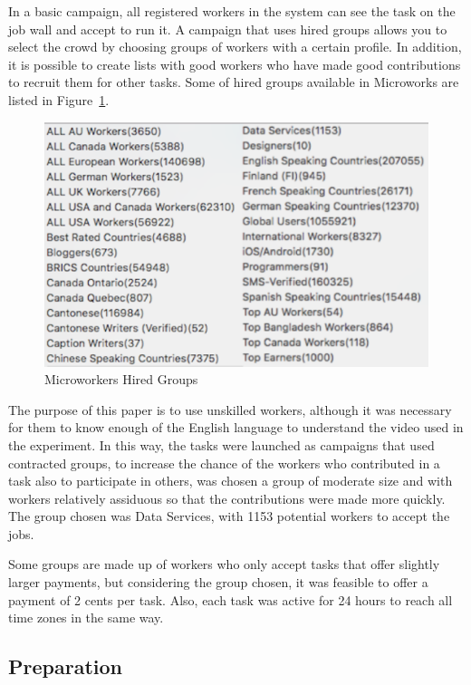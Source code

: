 In a basic campaign, all registered workers in the system can see the task on the job wall and accept to run it. A campaign that uses hired groups allows you to select the crowd by choosing groups of workers with a certain profile. In addition, it is possible to create lists with good workers who have made good contributions to recruit them for other tasks. Some of hired groups available in Microworks are listed in Figure~\ref{groups}.
\begin{figure}[h!]
 \centerline{\includegraphics[scale=0.25] {figure/groups}}
	\caption{Microworkers Hired Groups}
	\label{groups}
\end{figure}

The purpose of this paper is to use unskilled workers, although it was necessary for them to know enough of the English language to understand the video used in the experiment. In this way, the tasks were launched as campaigns that used contracted groups, to increase the chance of the workers who contributed in a task also to participate in others, was chosen a group of moderate size and with workers relatively assiduous so that the contributions were made more quickly. The group chosen was Data Services, with 1153 potential workers to accept the jobs.

Some groups are made up of workers who only accept tasks that offer slightly larger payments, but considering the group chosen, it was feasible to offer a payment of 2 cents per task. Also, each task was active for 24 hours to reach all time zones in the same way.

\subsection{Preparation}

